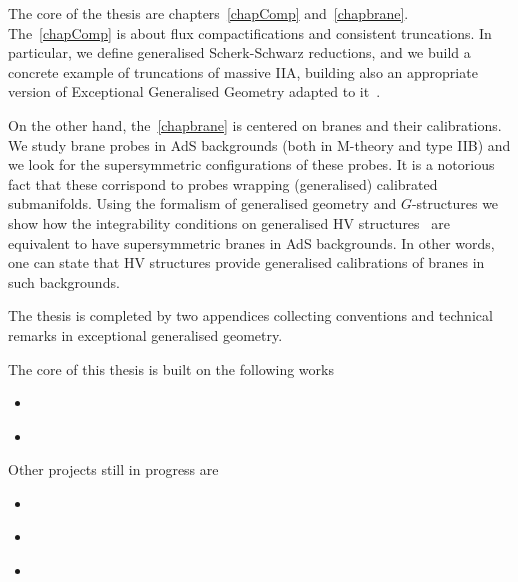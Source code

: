 \documentclass[draft]{phd}
\begin{document}
			The core of the thesis are chapters~\ref{chapComp} and~\ref{chapbrane}.
			The~\cref{chapComp} is about flux compactifications and consistent truncations. 
			In particular, we define generalised Scherk-Schwarz reductions, and we build a concrete example of truncations of massive IIA, building also an appropriate version of Exceptional Generalised Geometry adapted to it~\cite{oscar1}.
			
			On the other hand, the~\cref{chapbrane} is centered on branes and their calibrations.
			We study brane probes in AdS backgrounds (both in M-theory and type IIB) and we look for the supersymmetric configurations of these probes. It is a notorious fact that these corrispond to probes wrapping (generalised) calibrated submanifolds.
			Using the formalism of generalised geometry and $G$-structures we show how the integrability conditions on generalised HV structures~\cite{AshmoreESE} are equivalent to have supersymmetric branes in AdS backgrounds. 
			In other words, one can state that HV structures provide generalised calibrations of branes in such backgrounds.
			
			The thesis is completed by two appendices collecting conventions and technical remarks in exceptional generalised geometry.
			
			The core of this thesis is built on the following works
					\begin{itemize}
						\item[] \cite{oscar1}~
						\item[] \cite{oscar2}~
					\end{itemize}
			Other projects still in progress are
					\begin{itemize}
						\item[] \cite{oscar3}~
						\item[] \cite{oscar4}~
						\item[] \cite{oscar5}~
					\end{itemize}
\end{document}
